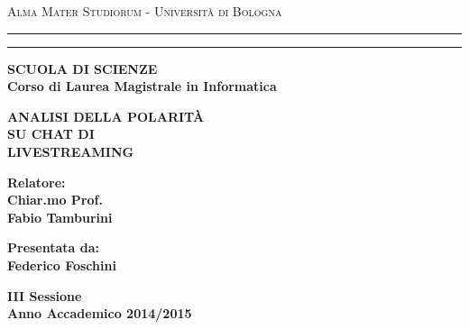 \documentclass[12pt,a4paper]{report}
\begin{document}
\begin{titlepage}
\begin{center}
{{\Large{\textsc{Alma Mater Studiorum - Universit\`a di
Bologna}}}} \rule[0.1cm]{15.8cm}{0.1mm}
\rule[0.5cm]{15.8cm}{0.6mm}
{\small{\bf SCUOLA DI SCIENZE\\
Corso di Laurea Magistrale in Informatica}}
\end{center}
\vspace{15mm}
\begin{center}
{\LARGE{\bf ANALISI DELLA POLARIT\`A}}\\
\vspace{3mm}
{\LARGE{\bf SU CHAT DI}}\\
\vspace{3mm}
{\LARGE{\bf LIVESTREAMING}}\\
\end{center}
\vspace{40mm}
\par
\noindent
\begin{minipage}[t]{0.47\textwidth}
{\large{\bf Relatore:\\
Chiar.mo Prof. \\
Fabio Tamburini}}
\end{minipage}
\hfill
\begin{minipage}[t]{0.47\textwidth}\raggedleft
{\large{\bf Presentata da:\\
Federico Foschini}}
\end{minipage}
\vspace{20mm}
\begin{center}
{\large{\bf III Sessione\\%
Anno Accademico 2014/2015}}%
\end{center}
\end{titlepage}
\begin{titlepage}
\textit{ }
\end{titlepage}
\end{document}

